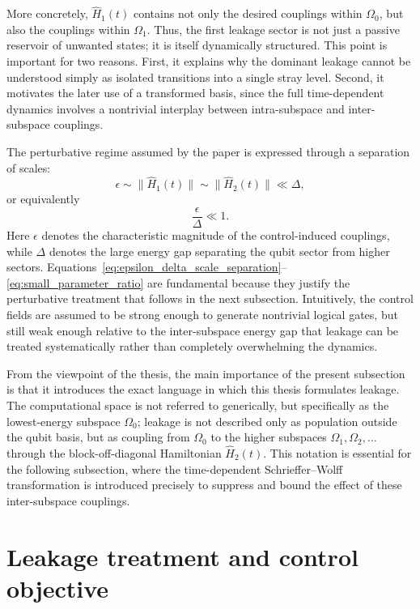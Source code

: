More concretely, $\hat{H}_1(t)$ contains not only the desired couplings within $\Omega_0$, but also the couplings within $\Omega_1$. Thus, the first leakage sector is not just a passive reservoir of unwanted states; it is itself dynamically structured. This point is important for two reasons. First, it explains why the dominant leakage cannot be understood simply as isolated transitions into a single stray level. Second, it motivates the later use of a transformed basis, since the full time-dependent dynamics involves a nontrivial interplay between intra-subspace and inter-subspace couplings.

The perturbative regime assumed by the paper is expressed through a separation of scales:
\begin{equation}
\epsilon
\sim
\|\hat{H}_1(t)\|
\sim
\|\hat{H}_2(t)\|
\ll
\Delta,
\label{eq:epsilon_delta_scale_separation}
\end{equation}
or equivalently
\begin{equation}
\frac{\epsilon}{\Delta} \ll 1.
\label{eq:small_parameter_ratio}
\end{equation}
Here $\epsilon$ denotes the characteristic magnitude of the control-induced couplings, while $\Delta$ denotes the large energy gap separating the qubit sector from higher sectors. Equations~\eqref{eq:epsilon_delta_scale_separation}--\eqref{eq:small_parameter_ratio} are fundamental because they justify the perturbative treatment that follows in the next subsection. Intuitively, the control fields are assumed to be strong enough to generate nontrivial logical gates, but still weak enough relative to the inter-subspace energy gap that leakage can be treated systematically rather than completely overwhelming the dynamics.

From the viewpoint of the thesis, the main importance of the present subsection is that it introduces the exact language in which this thesis formulates leakage. The computational space is not referred to generically, but specifically as the lowest-energy subspace $\Omega_0$; leakage is not described only as population outside the qubit basis, but as coupling from $\Omega_0$ to the higher subspaces $\Omega_1,\Omega_2,\dots$ through the block-off-diagonal Hamiltonian $\hat{H}_2(t)$. This notation is essential for the following subsection, where the time-dependent Schrieffer--Wolff transformation is introduced precisely to suppress and bound the effect of these inter-subspace couplings.


\section{Leakage treatment and control objective}



